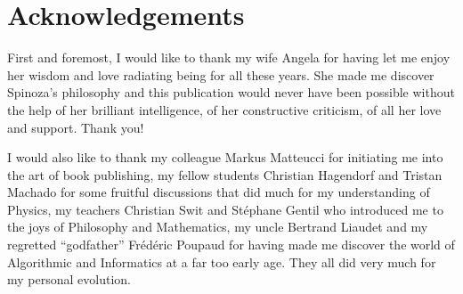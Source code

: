 \cleardoublepage
\section*{Acknowledgements}

First and foremost, I would like to thank my wife Angela for having let me enjoy her wisdom and love radiating being for all these years.
She made me discover Spinoza's philosophy and this publication would never have been possible without the help of her brilliant intelligence, of her constructive criticism, of all her love and support.
Thank you!

I would also like to thank my colleague Markus Matteucci for initiating me into the art of book publishing, my fellow students Christian Hagendorf and Tristan Machado for some fruitful discussions that did much for my understanding of Physics, my teachers Christian Swit and Stéphane Gentil who introduced me to the joys of Philosophy and Mathematics, my uncle Bertrand Liaudet and my regretted ``godfather'' Frédéric Poupaud for having made me discover the world of Algorithmic and Informatics at a far too early age.
They all did very much for my personal evolution.
